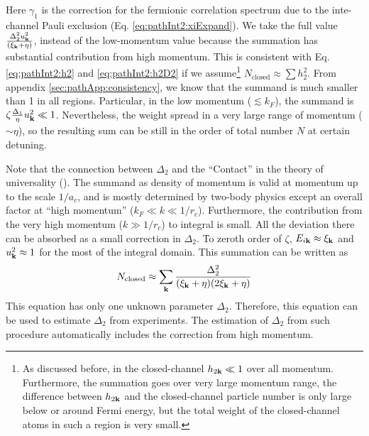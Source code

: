 \begin{unsure}
Here $\gamma_{1}$ is the correction for the fermionic correlation spectrum due to the inte-channel Pauli exclusion (Eq. \ref{eq:pathInt2:xiExpand}).  We  take the full value $\frac{\Delta_{2}^2u_{\mathbf{k}}^{2}}{(\xi_{\mathbf{k}}+\eta)}$, instead of the low-momentum value because the summation has substantial contribution from  high momentum.  This is consistent with Eq. \ref{eq:pathInt2:h2} and \ref{eq:pathInt2:h2D2} if we assume\footnote{As discussed before, in the closed-channel $h_{2\mathbf{k}}\ll1$ over all momentum.  Furthermore, the summation goes over very large momentum range, the difference between $h_{2\mathbf{k}}$ and the closed-channel particle number is only large below or around Fermi energy, but the total weight of the closed-channel atoms  in such a region is very small.  }  $N_{\text{closed}}\approx\sum{h_{2}^{2}}$.    From appendix \ref{sec:pathApp:consistency}, we know that the summand is much smaller than 1 in all regions. Particular, in the low momentum ($\lesssim{}k_{F}$), the summand is $\zeta\frac{\Delta_{1}}{\eta}u_{\mathbf{k}}^{2}\ll1$. Nevertheless, the weight spread in a very large range of momentum ($\sim\eta$), so the resulting sum can be still in the order of total number $N$ at certain detuning. 

Note that the connection between $\Delta_{2}$ and the ``Contact'' in the theory of universality (\cite{Tan2008-1,Tan2008-2}).  The summand as  density of momentum is valid at momentum up to the scale $1/a_{c}$, and is mostly determined by two-body physics except an overall factor at ``high momentum'' ($k_{F}\ll{}k\ll{}1/r_{c}$).  Furthermore, the contribution from the very high momentum ($k\gg1/r_{c}$) to integral is small.  All the deviation there can be absorbed as a small correction in $\Delta_{2}$.  To zeroth order of $\zeta$, $E_{i\mathbf{k}}\approx\xi_{\mathbf{k}}$ and $u_{\mathbf{k}}^2\approx1$ for the most of the integral domain.  This summation can be written as 
\begin{equation}\label{eq:pathInt2:closeD2}
N_{\text{closed}}\approx\sum_{\mathbf{k}}\frac{\Delta_{2}^2}{(\xi_{\mathbf{k}}+\eta)(2\xi_{\mathbf{k}}+\eta)}
\end{equation}
This equation has only one unknown parameter $\Delta_{2}$.  Therefore, this equation can be used to estimate $\Delta_{2}$ from experiments.  The  estimation of  $\Delta_{2}$ from such procedure automatically includes the correction from  high momentum. 



\end{unsure}
